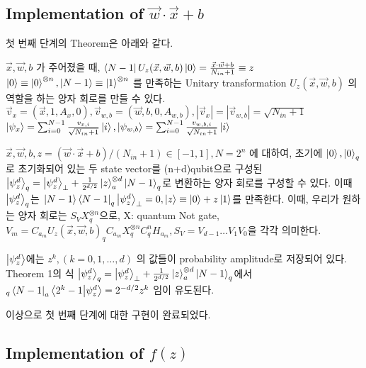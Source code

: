 \subsection{Implementation of \(\vec{w}\cdot\vec{x}+b\)}

첫 번째 단계의 Theorem은 아래와 같다.

\begin{lemma}
    \(\vec{x}, \vec{w}, b\) 가 주어졌을 때, \(\bra{N-1}U_z(\vec{x},\vec{w},b)\ket{0} = \frac{\vec{x}\cdot \vec{w}+b}{N_{in}+1} \equiv z\)
    \(\ket{0} \equiv \ket{0}^{\otimes n}, \ket{N-1} \equiv \ket{1}^{\otimes n}\) 를 만족하는 Unitary transformation \(U_z(\vec{x},\vec{w},b)\) 의 역할을 하는 양자 회로를 만들 수 있다.
    \(\vec{v}_x = (\vec{x},1,A_x,0), \vec{v}_{w,b} = (\vec{w},b,0,A_{w,b}),|\vec{v}_x| = |\vec{v}_{w,b}| = \sqrt{N_{in}+1}\)
    \(\ket{\psi_{x}} = \sum_{i=0}^{N-1}\frac{v_{x,i}}{\sqrt{N_{in}+1}}\ket{i}, \ket{\psi_{w,b}} = \sum_{i=0}^{N-1}\frac{v_{w,b,i}}{\sqrt{N_{in}+1}}\ket{i}\)
\end{lemma}

\begin{theorem}
    \(\vec{x}, \vec{w},b,z = (\vec{w}\cdot\vec{x} + b)/(N_{in}+1) \in [-1,1], N = 2^n\) 에 대하여, 초기에 \(\ket{0}, \ket{0}_q\)로 초기화되어 있는 두 state vector를 (n+d)qubit으로 구성된\(\ket{\psi_z^d}_q = \ket{\psi_z^d}_\perp + \frac{1}{2^{d/2}}\ket{z}_a^{\otimes d}\ket{N-1}_q\)로 변환하는 양자 회로를 구성할 수 있다. 이때 \(\ket{\psi_z^d}_q\)는 \(\ket{N-1} \bra{N-1}_q\ket{\psi_z^d}_\perp = 0, \ket{z} \equiv \ket{0}+z\ket{1}\)를 만족한다. 이때, 우리가 원하는 양자 회로는 \(S_VX_q^{\otimes n}\)으로, X: quantum Not gate, \(V_m = C_{a_m}U_z(\vec{x},\vec{w},b)_qC_{a_m}X_q^{\otimes n}C_q^nH_{a_m}, S_V=V_{d-1}\dots V_1V_0\)을 각각 의미한다.
\end{theorem}

\begin{corollary}
    \(\ket{\psi_z^d}\)에는 \(z^k, (k = 0,1,\dots,d)\) 의 값들이 probability amplitude로 저장되어 있다. Theorem 1의 식 \(\ket{\psi_z^d}_q = \ket{\psi_z^d}_\perp + \frac{1}{2^{d/2}}\ket{z}_a^{\otimes d}\ket{N-1}_q\)에서 \(_q\bra{N-1}_a\bra{2^k-1}\ket{\psi_z^d} = 2^{-d/2}z^k\) 임이 유도된다.
\end{corollary}
이상으로 첫 번째 단계에 대한 구현이 완료되었다.

\subsection{Implementation of \(f(z)\)}

